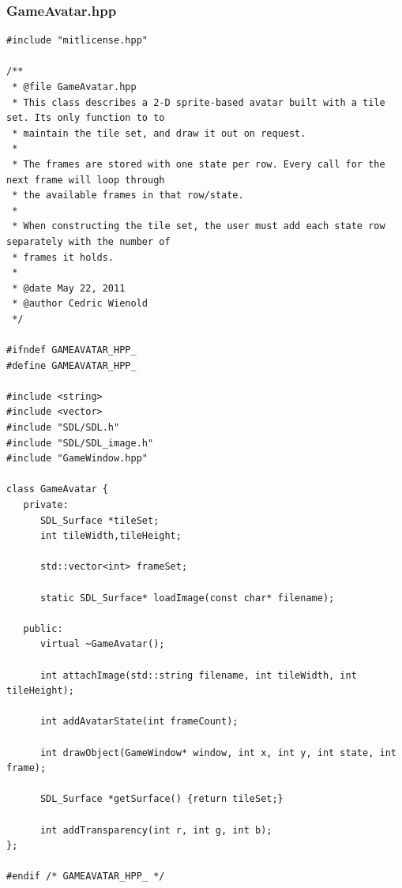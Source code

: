 \documentclass[12pt]{article}
\begin{document}
\subsubsection{GameAvatar.hpp}
\begin{lstlisting}[breaklines]
#include "mitlicense.hpp"

/**
 * @file GameAvatar.hpp
 * This class describes a 2-D sprite-based avatar built with a tile set. Its only function to to
 * maintain the tile set, and draw it out on request.
 *
 * The frames are stored with one state per row. Every call for the next frame will loop through
 * the available frames in that row/state.
 *
 * When constructing the tile set, the user must add each state row separately with the number of
 * frames it holds.
 *
 * @date May 22, 2011
 * @author Cedric Wienold
 */

#ifndef GAMEAVATAR_HPP_
#define GAMEAVATAR_HPP_

#include <string>
#include <vector>
#include "SDL/SDL.h"
#include "SDL/SDL_image.h"
#include "GameWindow.hpp"

class GameAvatar {
   private:
      SDL_Surface *tileSet;
      int tileWidth,tileHeight;

      std::vector<int> frameSet;

      static SDL_Surface* loadImage(const char* filename);
      
   public:
      virtual ~GameAvatar();
      
      int attachImage(std::string filename, int tileWidth, int tileHeight);
      
      int addAvatarState(int frameCount);
      
      int drawObject(GameWindow* window, int x, int y, int state, int frame);
      
      SDL_Surface *getSurface() {return tileSet;}
      
      int addTransparency(int r, int g, int b);
};

#endif /* GAMEAVATAR_HPP_ */
\end{lstlisting}
\end{document}
